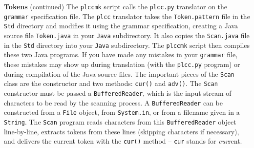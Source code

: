 \begin{minipage}[t]{\sw}
\slidenumber
\LARGE
{\bf Tokens} (continued)\exx
The \verb'plccmk' script calls the \verb'plcc.py' translator
on the \verb'grammar' specification file.
The \verb'plcc' translator takes the \verb'Token.pattern' file
in the \verb'Std' directory
and modifies it using the grammar specification,
creating a Java source file \verb'Token.java'
in your \verb'Java' subdirectory.
It also copies the \verb'Scan.java' file in the \verb'Std' directory
into your \verb'Java' subdirectory.
The \verb'plccmk' script then compiles these two Java programs.
If you have made any mistakes in your \verb'grammar' file,
these mistakes may show up during translation
(with the \verb'plcc.py' program)
or during compilation of the Java source files.\exx
The important pieces of the \verb'Scan' class
are the constructor and two methods: \verb'cur()' and \verb'adv()'.
The \verb'Scan' constructor must be passed
a \verb'BufferedReader',
which is the input stream of characters to be read by the scanning process.
A \verb'BufferedReader' can be constructed from a \verb'File' object,
from \verb'System.in', or from a filename given in a \verb'String'.
The \verb'Scan' program reads characters
from this \verb'BufferedReader' object
line-by-line, extracts tokens from these lines
(skipping characters if necessary),
and delivers the current token with the \verb'cur()' method --
\verb'cur' stands for {\em cur}rent.\exx
\end{minipage}
\clearpage
